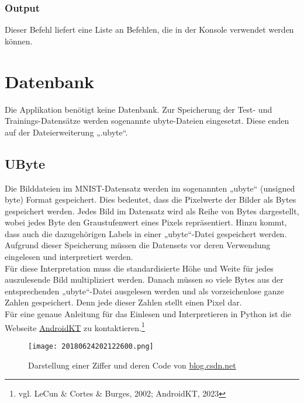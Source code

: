 \subsubsection{Output}
\label{sec:DesignHelpOutput}
Dieser Befehl liefert eine Liste an Befehlen, die in der Konsole verwendet werden können.

\section{Datenbank}
\label{sec:DesignDatenbank}
Die Applikation benötigt keine Datenbank. Zur Speicherung der Test- und Trainings-Datensätze werden sogenannte ubyte-Dateien eingesetzt. Diese enden auf der Dateierweiterung „.ubyte“.

\subsection{UByte}
\label{sec:DesignUByte}
Die Bilddateien im MNIST-Datensatz werden im sogenannten „ubyte“ (unsigned byte) Format gespeichert. Dies bedeutet, dass die Pixelwerte der Bilder als Bytes gespeichert werden. Jedes Bild im Datensatz wird als Reihe von Bytes dargestellt, wobei jedes Byte den Graustufenwert eines Pixels repräsentiert. Hinzu kommt, dass auch die dazugehörigen Labels in einer „ubyte“-Datei gespeichert werden.
\\
Aufgrund dieser Speicherung müssen die Datensets vor deren Verwendung eingelesen und interpretiert werden. 
\\
Für diese Interpretation muss die standardisierte Höhe und Weite für jedes auszulesende Bild multipliziert werden. Danach müssen so viele Bytes aus der entsprechenden „ubyte“-Datei ausgelesen werden und als vorzeichenlose ganze Zahlen gespeichert. Denn jede dieser Zahlen stellt einen Pixel dar.
\\
Für eine genaue Anleitung für das Einlesen und Interpretieren in Python ist die Webseite \href{https://androidkt.com/extract-images-from-mnist-idx3-ubyte-file-format-in-python/}{AndroidKT} zu kontaktieren.\footnote{vgl. LeCun \& Cortes \&  Burges, 2002; AndroidKT, 2023}

\begin{figure}[H]
	\centering
	\texttt{[image: 20180624202122600.png]}
	\caption{Darstellung einer Ziffer und deren Code von \href{https://blog.csdn.net/qq_41185868/article/details/79094752}{blog.csdn.net}}
	\label{fig:designubytecomp}
\end{figure}



